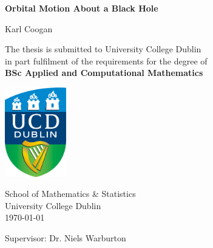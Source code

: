 \begin{titlepage}
    \begin{center}
        \vspace*{1cm}
        
        \Huge
        \textbf{Orbital Motion About a Black Hole}
        
        \vspace{1cm}
        
        Karl Coogan
        
        \vspace{1cm}

        \large
        The thesis is submitted to University College Dublin\\
in part fulfilment of the requirements for the degree of\\
\textbf{BSc Applied and Computational Mathematics}
        
        \vspace{1cm}
        
        \includegraphics[width=0.2\textwidth]{images/Universitycollegedublinlogo.png}
        
        \vspace{1cm}
        
        \large
        School of Mathematics \& Statistics\\
        University College Dublin\\
        \today

        \vspace{1cm}

        {\large Supervisor: Dr. Niels Warburton}
        
    \end{center}
\end{titlepage}
\thispagestyle{empty}
